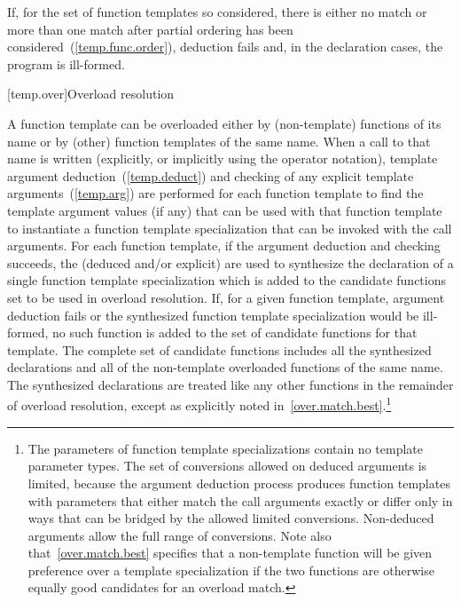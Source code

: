\pnum
If, for the set of function templates so considered, there is either no match or
more than one match after partial ordering has been considered~(\ref{temp.func.order}),
deduction fails and, in the declaration cases, the
program is ill-formed.

[temp.over]{Overload resolution}

\pnum
{}%
A function template can be overloaded either by (non-template) functions of its
name or by (other) function templates of the same name.
When a call to that name is written (explicitly, or implicitly using the
operator notation), template argument deduction~(\ref{temp.deduct})
and checking of any explicit template arguments~(\ref{temp.arg}) are performed
for each function template to find the template argument values (if any) that
can be used with that function template to instantiate a function template
specialization that can be invoked with the call arguments.
For each function template, if the argument deduction and checking succeeds,
the
(deduced and/or explicit)
are used to synthesize the declaration of
a single function template specialization which is
added to the candidate functions set to be used in overload resolution.
If, for a given function template, argument deduction fails or
the synthesized function template specialization would be ill-formed,
no such function is added to the set of candidate functions for that template.
The complete set of candidate functions includes all the synthesized
declarations and all of the non-template overloaded functions of
the same name.
The synthesized declarations are
treated like any other functions in
the remainder of overload resolution, except as explicitly noted
in~\ref{over.match.best}.\footnote{The parameters of function template
specializations contain no
template parameter types.
The set of conversions allowed on deduced arguments is limited, because the
argument deduction process produces function templates with parameters that
either match the call arguments exactly or differ only in ways that can be
bridged by the allowed limited conversions.
Non-deduced arguments allow the full range of conversions.
Note also that~\ref{over.match.best} specifies that a non-template function will
be given preference over a template specialization if the two functions
are otherwise equally good candidates for an overload match.}

